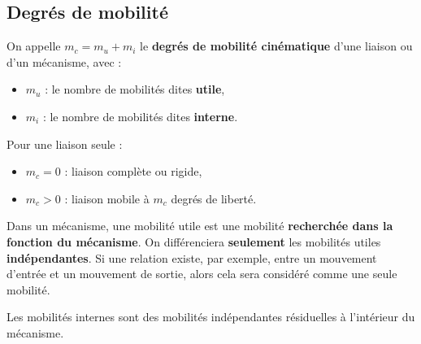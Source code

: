 \documentclass[10pt,fleqn]{article} %
\begin{document}
\begin{multicols}{2}
\begin{multicols}{2}
	\subsection{Degrés de mobilité}

	
		
		\begin{definition}
		On appelle $m_c=m_u+m_i$ le \textbf{degrés de mobilité cinématique} d'une liaison ou d'un mécanisme, avec :
			\begin{itemize}
				\item $m_u$ : le nombre de mobilités dites \textbf{utile},
				\item $m_i$ : le nombre de mobilités dites \textbf{interne}.
			\end{itemize}
		\end{definition}

		Pour une liaison seule :
		\begin{itemize}
			\item $m_c=0$ : liaison complète ou rigide,
			\item $m_c>0$ : liaison mobile à $m_c$ degrés de liberté.
		\end{itemize}

		\begin{remarques}
			\item Dans un mécanisme, une mobilité utile est une mobilité \textbf{recherchée dans la fonction du mécanisme}.
				On différenciera \textbf{seulement} les mobilités utiles \textbf{indépendantes}.
				Si une relation existe, par exemple, entre un mouvement d'entrée et un mouvement de sortie, alors cela sera considéré comme une seule mobilité.
			\item Les mobilités internes sont des mobilités indépendantes résiduelles à l'intérieur du mécanisme.
		\end{remarques}






\ifprof
\end{multicols}
\else
\end{multicols}
\fi
\end{document}
